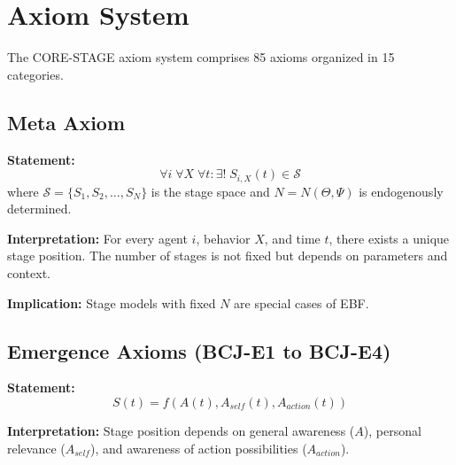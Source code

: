 
\section{Axiom System}
\label{sec:bcj-axioms}

The CORE-STAGE axiom system comprises 85 axioms organized in 15 categories.

\subsection{Meta Axiom}

\begin{tcolorbox}[colback=gray!5!white, colframe=gray!75!black,
    title=Axiom BCJ-M0: Fundamental Stage Existence]
\textbf{Statement:}
\begin{equation}
\forall i \; \forall X \; \forall t: \exists! \; S_{i,X}(t) \in \mathcal{S}
\end{equation}
where $\mathcal{S} = \{S_1, S_2, \ldots, S_N\}$ is the stage space and $N = N(\Theta, \Psi)$ is endogenously determined.

\textbf{Interpretation:} For every agent $i$, behavior $X$, and time $t$, there exists a unique stage position. The number of stages is not fixed but depends on parameters and context.

\textbf{Implication:} Stage models with fixed $N$ are special cases of EBF.
\end{tcolorbox}

\subsection{Emergence Axioms (BCJ-E1 to BCJ-E4)}

\begin{tcolorbox}[colback=gray!5!white, colframe=gray!75!black,
    title=Axiom BCJ-E1: Stage Emergence from Awareness]
\textbf{Statement:}
\begin{equation}
S(t) = f(A(t), A_{self}(t), A_{action}(t))
\end{equation}

\textbf{Interpretation:} Stage position depends on general awareness ($A$), personal relevance ($A_{self}$), and awareness of action possibilities ($A_{action}$).
\end{tcolorbox}

